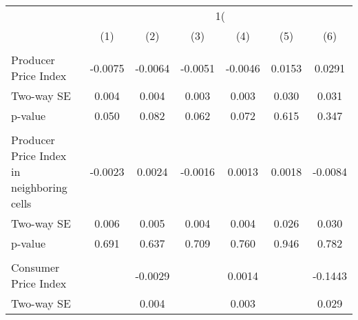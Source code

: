 {
\def\sym#1{\ifmmode^{#1}\else\(^{#1}\)\fi}
\begin{tabular}{l*{6}{c}}
\hline\hline
                    &&&\\\cmidrule(lr){2-3}\cmidrule(lr){4-5}\cmidrule(lr){6-7}
                    &         &         &         &         &         &         \\
\hline
\hline
\\ Producer Price Index&     -0.0075         &     -0.0064         &     -0.0051         &     -0.0046         &      0.0153         &      0.0291         \\
\hspace{15pt} Two-way SE &       0.004         &       0.004         &       0.003         &       0.003         &       0.030         &       0.031         \\
\hspace{15pt} p-value&       0.050         &       0.082         &       0.062         &       0.072         &       0.615         &       0.347         \\
\\  Producer Price Index in neighboring cells&     -0.0023         &      0.0024         &     -0.0016         &      0.0013         &      0.0018         &     -0.0084         \\
\hspace{15pt} Two-way SE&       0.006         &       0.005         &       0.004         &       0.004         &       0.026         &       0.030         \\
\hspace{15pt} p-value&       0.691         &       0.637         &       0.709         &       0.760         &       0.946         &       0.782         \\
\\ Consumer Price Index&                     &     -0.0029         &                     &      0.0014         &                     &     -0.1443         \\
\hspace{15pt} Two-way SE &                     &       0.004         &                     &       0.003         &                     &       0.029         \\

\end{tabular}}
